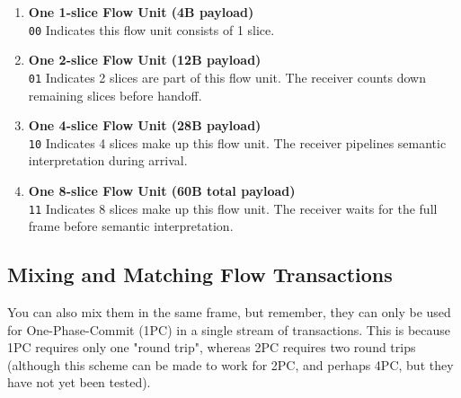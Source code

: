 \documentclass[../OAE-SPEC-MAIN.tex]{subfiles}
\begin{document}
\begin{enumerate}
  \item \textbf{One 1-slice Flow Unit (4B payload)} \\
  \texttt{00} Indicates this flow unit consists of 1 slice.

  \item \textbf{One 2-slice Flow Unit (12B payload)} \\
  \texttt{01} Indicates 2 slices are part of this flow unit. The receiver counts down remaining slices before handoff.

  \item \textbf{One 4-slice Flow Unit (28B payload)} \\
  \texttt{10} Indicates 4 slices make up this flow unit. The receiver pipelines semantic interpretation during arrival.

  \item \textbf{One 8-slice Flow Unit (60B total payload)} \\
  \texttt{11} Indicates 8 slices make up this flow unit. The receiver waits for the full frame before semantic interpretation.
\end{enumerate}

\subsection{Mixing and Matching Flow Transactions}


You can also mix them in the same frame, but remember, they can only be used for One-Phase-Commit (1PC) in a single stream of transactions. This is because 1PC requires only one "round trip", whereas 2PC requires two round trips (although this scheme can be made to work for 2PC, and perhaps 4PC, but they have not yet been tested).

 

%
\end{document}
